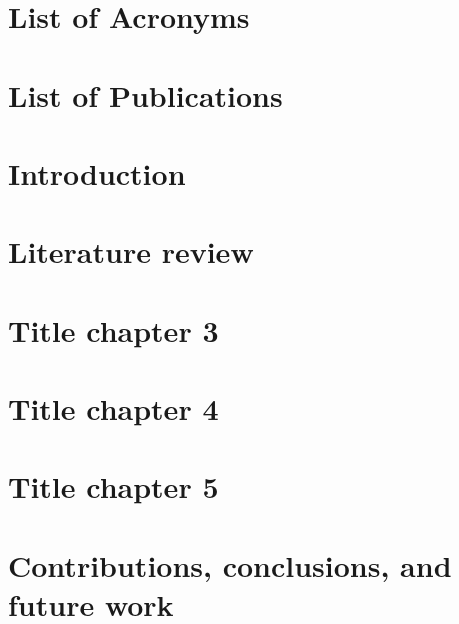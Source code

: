 \documentclass[12pt]{book}
\begin{document}
\chapter*{List of Acronyms} 


\chapter*{List of Publications}


\mainmatter
\onehalfspacing
\chapter{Introduction}
\label{sec:chapter1}


\chapter{Literature review}
\label{sec:chapter2}


\chapter{Title chapter 3} 
\label{sec:chapter3}


\chapter{Title chapter 4} 
\label{sec:chapter4}


\chapter{Title chapter 5} 
\label{sec:chapter5}


\chapter{Contributions, conclusions, and future work} 
\label{sec:chapter6}


%
%


\end{document}
